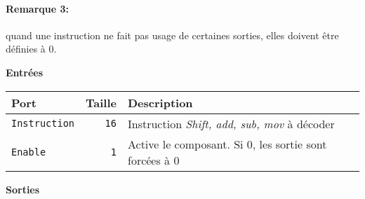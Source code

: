 \documentclass{article}
\begin{document}
    \paragraph{Remarque 3:} quand une instruction ne fait pas usage de certaines sorties, elles doivent être définies à 0.



    \textbf{Entrées}\\

    \begin{tabular}{|l|r|l|}
        \hline
        \textbf{Port}       & \textbf{Taille} & \textbf{Description}                                   \\
        \hline

        \texttt{Instruction} & \texttt{16}     & Instruction \textit{Shift, add, sub, mov} à décoder    \\
        \hline
        \texttt{Enable}     & \texttt{1}      & Active le composant.
        Si 0, les sortie sont forcées à 0 \\


        \hline
    \end{tabular}

    \vspace{1em}
    \textbf{Sorties}\\
\end{document}
